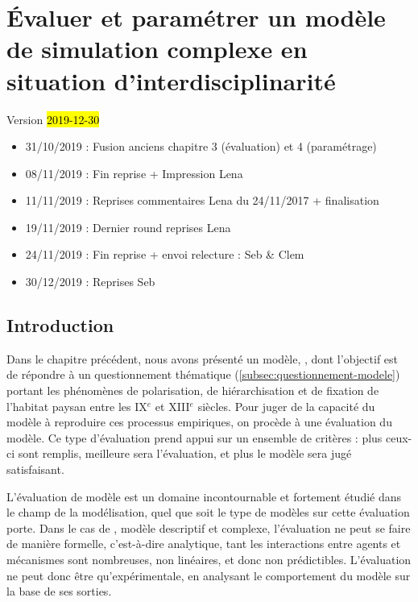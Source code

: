 \setcounter{chapter}{2}
\graphicspath{{chap3/}}


\chapter{Évaluer et paramétrer un modèle de simulation complexe en situation d'interdisciplinarité}
\label{chap:chap3}
\begin{center}
{\large Version \hl{2019-12-30}}
\end{center}

\begin{itemize}
	\item 31/10/2019 : Fusion anciens chapitre 3 (évaluation) et 4 (paramétrage)
	\item 08/11/2019 : Fin reprise + Impression Lena
	\item 11/11/2019 : Reprises commentaires Lena du 24/11/2017 + finalisation
	\item 19/11/2019 : Dernier round reprises Lena
	\item 24/11/2019 : Fin reprise + envoi relecture : Seb \& Clem
	\item 30/12/2019 : Reprises Seb
\end{itemize}
\setcounter{minitocdepth}{2}
\minitoc
\clearpage
{}

\section*{Introduction}
\label{sec:chap3-intro}

Dans le chapitre précédent, nous avons présenté un modèle, \simfeodal{}, dont l'objectif est de répondre à un questionnement thématique (\cref{subsec:questionnement-modele}) portant les phénomènes de polarisation, de hiérarchisation et de fixation de l'habitat paysan entre les IX$^e$ et XIII$^e$ siècles.
Pour juger de la capacité du modèle à reproduire ces processus empiriques, on procède à une \og évaluation\fg{} du modèle.
Ce type d'évaluation prend appui sur un ensemble de critères : plus ceux-ci sont remplis, meilleure sera l'évaluation, et plus le modèle sera jugé satisfaisant.

L'évaluation de modèle est un domaine incontournable et fortement étudié dans le champ de la modélisation, quel que soit le type de modèles sur cette évaluation porte.
Dans le cas de \simfeodal{}, modèle descriptif et complexe, l'évaluation ne peut se faire de manière formelle, c'est-à-dire analytique, tant les interactions entre agents et mécanismes sont nombreuses, non linéaires, et donc non prédictibles.
L'évaluation ne peut donc être qu'expérimentale, en analysant le comportement du modèle sur la base de ses sorties.

